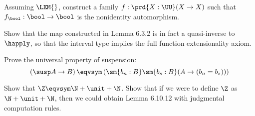 Assuming $\LEM{}$, construct a family $f : \prd{X : \UU} (X \to X)$ such that
$f_{\bool} : \bool \to \bool$ is the nonidentity automorphism.


Show that the map constructed in Lemma 6.3.2 is in fact a quasi-inverse to
$\happly$, so that the interval type implies the full function extensionality
axiom.


Prove the universal property of suspension:
\[
  \left(\susp A \to B \right)
  \eqvsym
  \left(\sm{b_{n} : B}\sm{b_{s} : B} (A \to (b_{n} = b_{s}))\right)
\]


Show that $\Z \eqvsym \N + \unit + \N$.  Show that if we were to define $\Z$ as
$\N + \unit + \N$, then we could obtain Lemma 6.10.12 with judgmental
computation rules.
\begin{coqdoccode}
\end{coqdoccode}
